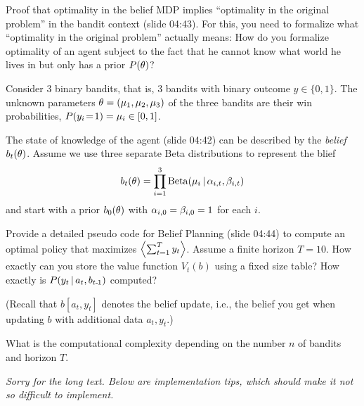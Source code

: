 

Proof that optimality in the belief MDP implies ``optimality in
the original problem'' in the bandit context (slide 04:43). For this,
you need to formalize what ``optimality in the original problem''
actually means: How do you formalize optimality of an agent subject to
the fact that he cannot know what world he lives in but only has a
prior $P(\theta)$?



Consider 3 binary bandits, that is, 3 bandits with binary outcome
$y\in\{0,1\}$. The unknown parameters $\theta=(\mu_1,\mu_2,\mu_3)$ of the three
bandits are their win probabilities, $P(y_i \!=\! 1) = \mu_i \in [0,1]$.

The state of knowledge of the agent (slide 04:42) can be described
by the \emph{belief} $b_t(\theta)$. Assume we use three separate Beta
distributions to represent the blief
$$b_t(\theta) = \prod_{i=1}^3 {\rm Beta}(\mu_i \,|\, \alpha_{i,t}, \beta_{i,t})$$
and start with a prior $b_0(\theta)$ with $\alpha_{i,0}=\beta_{i,0}=1$ for each $i$.

Provide a detailed pseudo code for Belief Planning (slide 04:44)
to compute an optimal policy that maximizes $\left\langle\sum_{t=1}^T
y_t\right\rangle$. Assume a finite horizon $T=10$. How exactly can you store the
value function $V_t(b)$ using a fixed size table? How exactly is
$P(y_t\,|\,a_t,b_{t{{\hspace*{-.0pt}\text{\rm -}\hspace*{-.5pt}}1}})$ computed?

(Recall that $b[a_t,y_t]$ denotes the belief update, i.e., the belief
you get when updating $b$ with additional data $a_t,y_t$.)

What is the computational complexity depending on the number $n$ of
bandits and horizon $T$.



\emph{Sorry for the long text. Below are implementation tips, which
should make it not so difficult to implement.}

